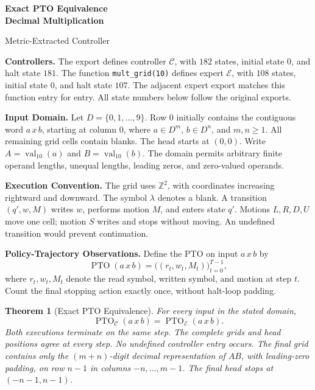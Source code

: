\documentclass[11pt,a4paper]{article}
\date{}
\newcommand{\blank}{\lambda}
\newcommand{\digits}{\{0,1,\ldots,9\}}
\newcommand{\EXPERT}{\mathcal E}
\newcommand{\CTRL}{\mathcal C}
\newcommand{\PTO}{\operatorname{PTO}}
\newcommand{\code}[1]{\texttt{#1}}
\newtheorem{theorem}{Theorem}
\newcommand{\sectiontitle}[2]{\refstepcounter{section}\vspace*{2pt}{\LARGE\bfseries\color{Teal}\thesection\quad #2}\par\vspace{7pt}}
\begin{document}
{\Huge\bfseries Exact PTO Equivalence\\[3pt]Decimal Multiplication}\par
\vspace{10pt}
{\Large Metric-Extracted Controller}\par
{\small\color{Muted}}\par
\vspace{7pt}

\vspace{4pt}
\sectiontitle{1 \enspace STATEMENT AND SCOPE}{Statement and Scope}\label{sec:common1}
\textbf{Controllers.}
The export  defines controller $\CTRL$, with
$182$ states, initial state $0$, and halt state $181$.
The function \code{mult\_grid(10)} defines expert $\EXPERT$, with
$108$ states, initial state $0$, and halt state $107$.
The adjacent expert export matches this function entry for entry.
All state numbers below follow the original exports.

\textbf{Input Domain.}
Let $D=\digits$. Row $0$ initially contains the contiguous word $a\,x\,b$,
starting at column $0$, where $a\in D^m$, $b\in D^n$, and $m,n\ge1$.
All remaining grid cells contain blanks. The head starts at $(0,0)$.
Write $A=\operatorname{val}_{10}(a)$ and $B=\operatorname{val}_{10}(b)$.
The domain permits arbitrary finite operand lengths, unequal lengths,
leading zeros, and zero-valued operands.

\textbf{Execution Convention.}
The grid uses $\mathbb Z^2$, with coordinates increasing rightward and
downward. The symbol $\blank$ denotes a blank. A transition $(q',w,M)$
writes $w$, performs motion $M$, and enters state $q'$.
Motions $L,R,D,U$ move one cell; motion $S$ writes and stops without moving.
An undefined transition would prevent continuation.

\textbf{Policy-Trajectory Observations.}
Define the PTO on input $a\,x\,b$ by
\[
\PTO(a\,x\,b)=\bigl((r_t,w_t,M_t)\bigr)_{t=0}^{T-1},
\]
where $r_t,w_t,M_t$ denote the read symbol, written symbol, and motion
at step $t$. Count the final stopping action exactly once, without halt-loop padding.

\begin{theorem}[Exact PTO Equivalence]\label{thm:main}
For every input in the stated domain,
\[
\PTO_{\CTRL}(a\,x\,b)=\PTO_{\EXPERT}(a\,x\,b).
\]
Both executions terminate on the same step. The complete grids and head
positions agree at every step. No undefined controller entry occurs.
The final grid contains only the $(m+n)$-digit decimal representation of
$AB$, with leading-zero padding, on row $n-1$ in columns $-n,\ldots,m-1$.
The final head stops at $(-n-1,n-1)$.
\end{theorem}
\end{document}
